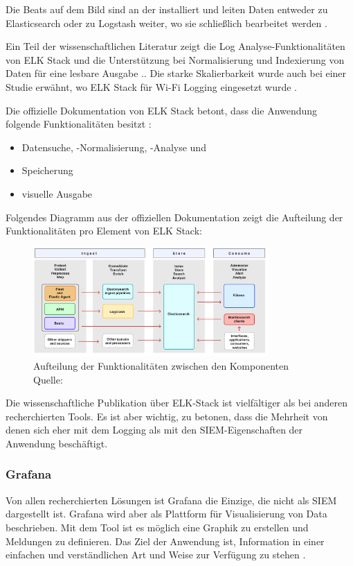 Die Beats auf dem Bild sind an der  installiert und leiten Daten entweder zu Elasticsearch oder zu Logstash weiter, wo sie schließlich bearbeitet werden \citep{Jain_LMELK}. 

Ein Teil der wissenschaftlichen Literatur zeigt die Log Analyse-Funktionalitäten von ELK Stack und die Unterstützung bei Normalisierung und Indexierung von Daten für eine lesbare Ausgabe \citep{Advani_elkstakc}.. Die starke Skalierbarkeit wurde auch bei einer Studie erwähnt, wo ELK Stack für Wi-Fi Logging eingesetzt wurde \citep{Wang_elkwifi}. 

Die offizielle Dokumentation von ELK Stack betont, dass die Anwendung folgende Funktionalitäten besitzt \citep{elastic_docs}: 

\begin{itemize}[noitemsep]
   \item Datensuche, -Normalisierung, -Analyse und 
   \item Speicherung
   \item visuelle Ausgabe
\end{itemize}

Folgendes Diagramm aus der offiziellen Dokumentation zeigt die Aufteilung der Funktionalitäten pro Element von ELK Stack:

\begin{figure}[H]
   \centering
   \includegraphics[width=0.8\textwidth]{assets/2_p9.png}
   \caption{Aufteilung der Funktionalitäten zwischen den Komponenten\\Quelle: \citep{elastic_docs}}
   \centering
\end{figure}

Die wissenschaftliche Publikation über ELK-Stack ist vielfältiger als bei anderen recherchierten Tools. Es ist aber wichtig, zu betonen, dass die Mehrheit von denen sich eher mit dem Logging als mit den \gls{SIEM}-Eigenschaften der Anwendung beschäftigt.


\subsubsection{Grafana}
Von allen recherchierten Lösungen ist Grafana die Einzige, die nicht als \gls{SIEM} dargestellt ist. Grafana wird aber als Plattform für Visualisierung von Data beschrieben. Mit dem Tool ist es möglich eine Graphik zu erstellen und Meldungen zu definieren. Das Ziel der Anwendung ist, Information in einer einfachen und verständlichen Art und Weise zur Verfügung zu stehen \citep{redhat_grafana}.  

